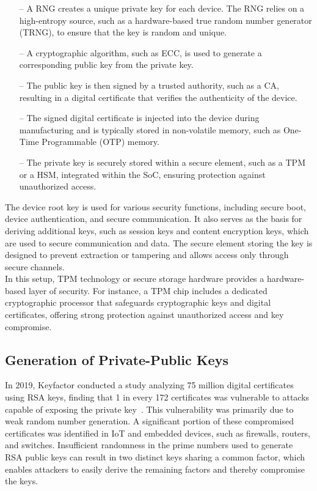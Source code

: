 \documentclass[pdflatex,sn-mathphys-num]{sn-jnl}%
\theoremstyle{thmstyleone}%
\theoremstyle{thmstyletwo}%
\theoremstyle{thmstylethree}%
\begin{document}
\begin{enumerate}

\item[--] A RNG creates a unique private key for each device. The RNG relies on a high-entropy source, such as a hardware-based true random number generator (TRNG), to ensure that the key is random and unique.

\item[--] A cryptographic algorithm, such as ECC, is used to generate a corresponding public key from the private key.

\item[--] The public key is then signed by a trusted authority, such as a CA, resulting in a digital certificate that verifies the authenticity of the device.

\item[--] The signed digital certificate is injected into the device during manufacturing and is typically stored in non-volatile memory, such as One-Time Programmable (OTP) memory.

\item[--] The private key is securely stored within a secure element, such as a TPM or a HSM, integrated within the SoC, ensuring protection against unauthorized access.

\end{enumerate}

The device root key is used for various security functions, including secure boot, device authentication, and secure communication. It also serves as the basis for deriving additional keys, such as session keys and content encryption keys, which are used to secure communication and data. The secure element storing the key is designed to prevent extraction or tampering and allows access only through secure channels.\\

In this setup, TPM technology or secure storage hardware provides a hardware-based layer of security. For instance, a TPM chip includes a dedicated cryptographic processor that safeguards cryptographic keys and digital certificates, offering strong protection against unauthorized access and key compromise.

\subsection{Generation of Private-Public Keys}

In 2019, Keyfactor conducted a study analyzing 75 million digital certificates using RSA keys, finding that 1 in every 172 certificates was vulnerable to attacks capable of exposing the private key~\cite{FactorRSA}. This vulnerability was primarily due to weak random number generation. A significant portion of these compromised certificates was identified in IoT and embedded devices, such as firewalls, routers, and switches. Insufficient randomness in the prime numbers used to generate RSA public keys can result in two distinct keys sharing a common factor, which enables attackers to easily derive the remaining factors and thereby compromise the keys.\\
\end{document}
